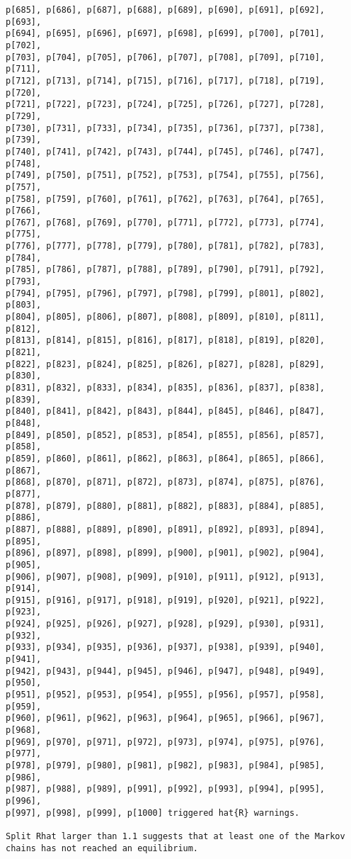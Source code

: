 \documentclass[
  letterpaper,
  DIV=11,
  numbers=noendperiod]{scrartcl}
\begin{document}
\begin{verbatim}
p[685], p[686], p[687], p[688], p[689], p[690], p[691], p[692], p[693],
p[694], p[695], p[696], p[697], p[698], p[699], p[700], p[701], p[702],
p[703], p[704], p[705], p[706], p[707], p[708], p[709], p[710], p[711],
p[712], p[713], p[714], p[715], p[716], p[717], p[718], p[719], p[720],
p[721], p[722], p[723], p[724], p[725], p[726], p[727], p[728], p[729],
p[730], p[731], p[733], p[734], p[735], p[736], p[737], p[738], p[739],
p[740], p[741], p[742], p[743], p[744], p[745], p[746], p[747], p[748],
p[749], p[750], p[751], p[752], p[753], p[754], p[755], p[756], p[757],
p[758], p[759], p[760], p[761], p[762], p[763], p[764], p[765], p[766],
p[767], p[768], p[769], p[770], p[771], p[772], p[773], p[774], p[775],
p[776], p[777], p[778], p[779], p[780], p[781], p[782], p[783], p[784],
p[785], p[786], p[787], p[788], p[789], p[790], p[791], p[792], p[793],
p[794], p[795], p[796], p[797], p[798], p[799], p[801], p[802], p[803],
p[804], p[805], p[806], p[807], p[808], p[809], p[810], p[811], p[812],
p[813], p[814], p[815], p[816], p[817], p[818], p[819], p[820], p[821],
p[822], p[823], p[824], p[825], p[826], p[827], p[828], p[829], p[830],
p[831], p[832], p[833], p[834], p[835], p[836], p[837], p[838], p[839],
p[840], p[841], p[842], p[843], p[844], p[845], p[846], p[847], p[848],
p[849], p[850], p[852], p[853], p[854], p[855], p[856], p[857], p[858],
p[859], p[860], p[861], p[862], p[863], p[864], p[865], p[866], p[867],
p[868], p[870], p[871], p[872], p[873], p[874], p[875], p[876], p[877],
p[878], p[879], p[880], p[881], p[882], p[883], p[884], p[885], p[886],
p[887], p[888], p[889], p[890], p[891], p[892], p[893], p[894], p[895],
p[896], p[897], p[898], p[899], p[900], p[901], p[902], p[904], p[905],
p[906], p[907], p[908], p[909], p[910], p[911], p[912], p[913], p[914],
p[915], p[916], p[917], p[918], p[919], p[920], p[921], p[922], p[923],
p[924], p[925], p[926], p[927], p[928], p[929], p[930], p[931], p[932],
p[933], p[934], p[935], p[936], p[937], p[938], p[939], p[940], p[941],
p[942], p[943], p[944], p[945], p[946], p[947], p[948], p[949], p[950],
p[951], p[952], p[953], p[954], p[955], p[956], p[957], p[958], p[959],
p[960], p[961], p[962], p[963], p[964], p[965], p[966], p[967], p[968],
p[969], p[970], p[971], p[972], p[973], p[974], p[975], p[976], p[977],
p[978], p[979], p[980], p[981], p[982], p[983], p[984], p[985], p[986],
p[987], p[988], p[989], p[991], p[992], p[993], p[994], p[995], p[996],
p[997], p[998], p[999], p[1000] triggered hat{R} warnings.

Split Rhat larger than 1.1 suggests that at least one of the Markov
chains has not reached an equilibrium.


\end{verbatim}
\end{document}
